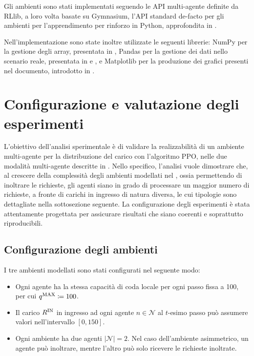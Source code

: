 Gli ambienti sono stati implementati seguendo le API multi-agente definite da RLlib, a loro volta basate su Gymnasium, l'API standard de-facto per gli ambienti per l'apprendimento per rinforzo in Python, approfondita in \cite{Towers2024}.

Nell'implementazione sono state inoltre utilizzate le seguenti librerie: NumPy per la gestione degli array, presentata in \cite{Harris2020}, Pandas per la gestione dei dati nello scenario reale, presentata in \cite{Mckinney2010} e \cite{Pandas2024}, e Matplotlib per la produzione dei grafici presenti nel documento, introdotto in \cite{Hunter2007}.

\section{Configurazione e valutazione degli esperimenti}

L'obiettivo dell'analisi sperimentale è di validare la realizzabilità di un ambiente multi-agente per la distribuzione del carico con l'algoritmo PPO, nelle due modalità multi-agente descritte in . Nello specifico, l'analisi vuole dimostrare che, al crescere della complessità degli ambienti modellati nel , ossia permettendo di inoltrare le richieste, gli agenti siano in grado di processare un maggior numero di richieste, a fronte di carichi in ingresso di natura diversa, le cui tipologie sono dettagliate nella sottosezione seguente. La configurazione degli esperimenti è stata attentamente progettata per assicurare risultati che siano coerenti e soprattutto riproducibili.

\subsection{Configurazione degli ambienti}

I tre ambienti modellati sono stati configurati nel seguente modo:

\begin{itemize}
    \item Ogni agente ha la stessa capacità di coda locale per ogni passo fissa a 100, per cui $q^\textnormal{MAX} \coloneqq 100$.

    \item Il carico $R^\textnormal{IN}$ in ingresso ad ogni agente $n \in \mathcal{N}$ al $t$-esimo passo può assumere valori nell'intervallo $[0, 150]$.

    \item Ogni ambiente ha due agenti $|\mathcal{N}| = 2$. Nel caso dell'ambiente asimmetrico, un agente può inoltrare, mentre l'altro può solo ricevere le richieste inoltrate.
\end{itemize}

